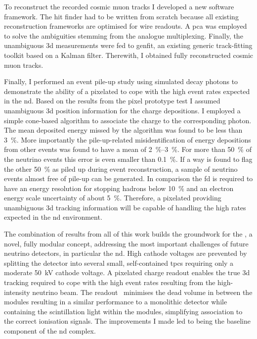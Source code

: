 To reconstruct the recorded cosmic muon tracks I developed a new software framework.
The hit finder had to be written from scratch because all existing \lartpc{} reconstruction frameworks are optimised for wire readouts.
A \gls{pca} was employed to solve the ambiguities stemming from the analogue multiplexing.
Finally, the unambiguous \gls{3d} measurements were fed to \gls{genfit}, an existing generic track-fitting toolkit based on a Kalman filter.
Therewith, I obtained fully reconstructed cosmic muon tracks.

Finally, I performed an event pile-up study using simulated \Pgpz decay photons to demonstrate the ability of a pixelated \lartpc{} to cope with the high event rates expected in the \dune{} \gls{nd}.
Based on the results from the pixel prototype test I assumed unambiguous \gls{3d} position information for the charge depositions.
I employed a simple cone-based algorithm to associate the charge to the corresponding photon.
The mean deposited energy missed by the algorithm was found to be less than \SI{3}{\percent}.
More importantly the pile-up-related misidentification of energy depositions from other events was found to have a mean of \SIrange{2}{3}{\percent}.
For more than \SI{50}{\percent} of the neutrino events this error is even smaller than \SI{0.1}{\percent}.
If a way is found to flag the other \SI{50}{\percent} as piled up during event reconstruction, a sample of neutrino events almost free of pile-up can be generated.
In comparison the \gls{fd} is required to have an energy resolution for stopping hadrons below \SI{10}{\percent} and an electron energy scale uncertainty of about \SI{5}{\percent}.
Therefore, a pixelated \lartpc{} providing unambiguous \gls{3d} tracking information will be capable of handling the high rates expected in the \dune{} \gls{nd} environment.

The combination of results from all of this work builds the groundwork for the \AC{}, a novel, fully modular \lartpc{} concept, addressing the most important challenges of future neutrino detectors, in particular the \dune{} \gls{nd}.
High cathode voltages are prevented by splitting the detector into several small, self-contained \glspl{tpc} requiring only a moderate \SI{50}{\kilo\volt} cathode voltage.
A pixelated charge readout enables the true \gls{3d} tracking required to cope with the high event rates resulting from the high-intensity neutrino beam.
The \AL{} readout~\cite{arclight} minimises the dead volume in between the modules resulting in a similar performance to a monolithic detector while containing the scintillation light within the modules, simplifying association to the correct ionisation signals.
The improvements I made led to \AC{} being the baseline \lar{} component of the \dune{} \gls{nd} complex.